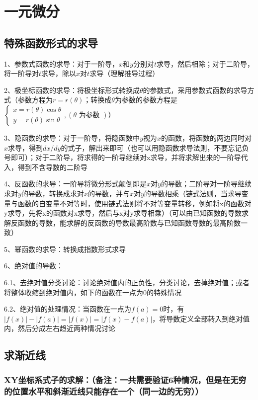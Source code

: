 \chapter{一元微分}

\section{特殊函数形式的求导}

1、参数式函数的求导：对于一阶导，$x$和$y$分别对$t$求导，然后相除；对于二阶导，将一阶导对$t$求导，除以$x$对$t$求导（理解推导过程）

2、极坐标函数的求导：将极坐标形式转换成$\theta$的参数式，采用参数式函数的求导方式（参数方程为$r=r(\theta)$；转换成$\theta$为参数的参数方程是$\left\{\begin{array}{l}x=r(\theta) \cos \theta \\y=r(\theta) \sin \theta\end{array},(\theta \text { 为参数 })\right.$）

3、隐函数的求导：对于一阶导，将隐函数中$y$视为$x$的函数，将函数的两边同时对$x$求导，得到$dx/dy$的式子，解出来即可（也可以用隐函数求导法则，不要忘记负号即可）；对于二阶导，将求得的一阶导继续对x求导，并将求解出来的一阶导代入，得到不含导数的二阶导

4、反函数的求导：一阶导将微分形式颠倒即是$x$对$y$的导数；二阶导对一阶导继续求对$y$的导数，转换成求对$x$的导数，并与$x$对$y$的导数相乘（链式法则，当求导变量与函数的自变量不对等时，使用链式法则将不对等变量转移，例如将x的函数对y求导，先将x的函数对x求导，然后与x对y求导相乘）（可以由已知函数的导数求解反函数的导数，能求解的反函数的导数最高阶数与已知函数导数的最高阶数一致）

5、幂函数的求导：转换成指数形式求导

6、绝对值的导数：

6.1、去绝对值分类讨论：讨论绝对值内的正负性，分类讨论，去掉绝对值；或者将整体收缩到绝对值内，如下的函数在一点为0的特殊情况

6.2、绝对值的处理情况：当函数在一点为$f(a)=0$时，有$|f(x)|-|f(a)|=|f(x)|=|f(x)-f(a)|$，将导数定义全部转入到绝对值内，然后分成左右趋近两种情况讨论

\section{求渐近线}



\subsection{XY坐标系式子的求解：（备注：一共需要验证6种情况，但是在无穷的位置水平和斜渐近线只能存在一个（同一边的无穷））}

